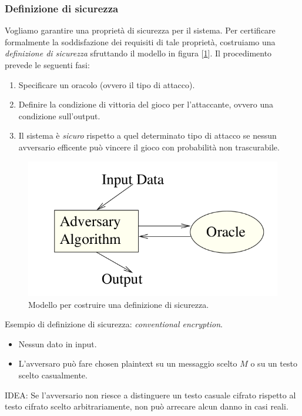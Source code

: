 \documentclass[a4paper, 11pt, notitlepage, fleqn]{report}
\begin{document}
\subsubsection{Definizione di sicurezza}
Vogliamo garantire una proprietà di sicurezza per il sistema. Per certificare formalmente la soddisfazione dei requisiti di tale proprietà, costruiamo una \emph{definizione di sicurezza} sfruttando il modello in figura [\ref{fig:modello-def-sicurezza}]. Il procedimento prevede le seguenti fasi:
\begin{enumerate}
	\item Specificare un oracolo (ovvero il tipo di attacco).
	\item Definire la condizione di vittoria del gioco per l'attaccante, ovvero una condizione sull'output.
	\item Il sistema è \emph{sicuro} rispetto a quel determinato tipo di attacco se nessun avversario efficente può vincere il gioco con probabilità non trascurabile.
\end{enumerate}
\begin{figure}[htp]
	\centering
	\includegraphics[width=.6\textwidth]{images/Definizione_sicurezza}
	\caption{Modello per costruire una definizione di sicurezza.}\label{fig:modello-def-sicurezza}
\end{figure}

\noindent Esempio di definizione di sicurezza: \emph{conventional encryption}.
\begin{itemize}
	\item Nessun dato in input.
	\item L'avversaro può fare chosen plaintext su un messaggio scelto $M$ o su un testo scelto casualmente.
\end{itemize}
IDEA: Se l'avversario non riesce a distinguere un testo casuale cifrato rispetto al testo cifrato scelto arbitrariamente, non può arrecare alcun danno in casi reali.
\end{document}
